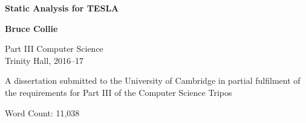 \begin{titlepage}
  \begin{center}
  
  \vspace*{1cm}
  \Huge\textbf{Static Analysis for TESLA}

  \LARGE
  \vspace{1.5cm}
  \textbf{Bruce Collie}

  \vspace{0.5cm}


  \large
  Part III Computer Science \\
  Trinity Hall, 2016--17

  \vfill

  \vspace{1.5cm}

  \normalsize
  A dissertation submitted to the University of Cambridge in partial fulfilment
    of the requirements for Part III of the Computer Science Tripos

  \vspace{1.5cm}

  \small
  Word Count: 11,038

  \end{center}
\end{titlepage}
